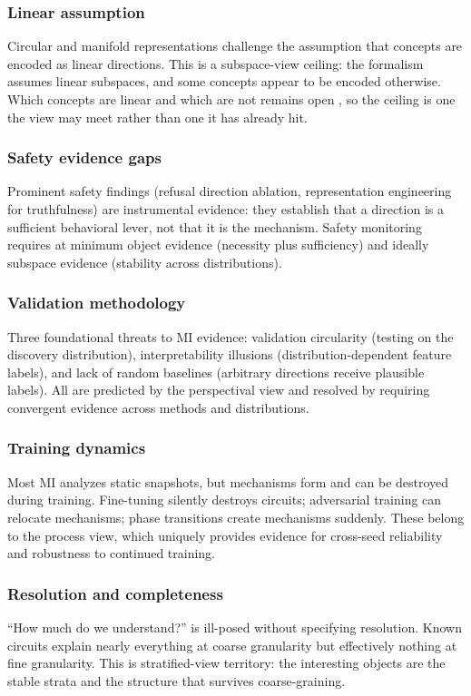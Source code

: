 \documentclass{article}
\begin{document}
\subsubsection{Linear assumption}
Circular and manifold representations challenge the assumption that
concepts are encoded as linear directions.  This is a subspace-view
ceiling: the formalism assumes linear subspaces, and some concepts
appear to be encoded otherwise.  Which concepts are linear and which
are not remains open \citep{anwar2024}, so the ceiling is one the view
may meet rather than one it has already hit.

\subsubsection{Safety evidence gaps}
Prominent safety findings (refusal direction ablation, representation
engineering for truthfulness) are instrumental evidence: they establish
that a direction is a sufficient behavioral lever, not that it is the
mechanism.  Safety monitoring requires at minimum object evidence
(necessity plus sufficiency) and ideally subspace evidence (stability
across distributions).

\subsubsection{Validation methodology}
Three foundational threats to MI evidence: validation circularity
(testing on the discovery distribution), interpretability illusions
(distribution-dependent feature labels), and lack of random baselines
(arbitrary directions receive plausible labels).  All are predicted by
the perspectival view and resolved by requiring convergent evidence
across methods and distributions.

\subsubsection{Training dynamics}
Most MI analyzes static snapshots, but mechanisms form and can be
destroyed during training.  Fine-tuning silently destroys
circuits; adversarial training can relocate mechanisms; phase
transitions create mechanisms suddenly.  These belong to the process
view, which uniquely provides evidence for cross-seed reliability
and robustness to continued training.

\subsubsection{Resolution and completeness}
``How much do we understand?'' is ill-posed without specifying
resolution.  Known circuits explain nearly everything at coarse
granularity but effectively nothing at fine granularity.  This is
stratified-view territory: the interesting objects are the stable
strata and the structure that survives coarse-graining.
\end{document}
